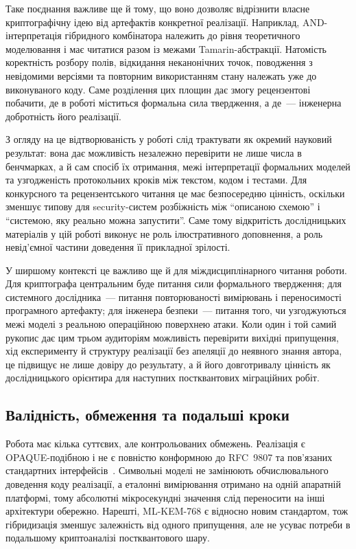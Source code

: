 \documentclass{llncs}
\begin{document}
Таке поєднання важливе ще й тому, що воно дозволяє відрізнити власне
криптографічну ідею від артефактів конкретної реалізації. Наприклад,
AND-інтерпретація гібридного комбінатора належить до рівня теоретичного
моделювання і має читатися разом із межами Tamarin-абстракції. Натомість
коректність розбору полів, відкидання неканонічних точок, поводження з
невідомими версіями та повторним використанням стану належать уже до
виконуваного коду. Саме розділення цих площин дає змогу рецензентові
побачити, де в роботі міститься формальна сила твердження, а де~---
інженерна добротність його реалізації.

З огляду на це відтворюваність у роботі слід трактувати як окремий
науковий результат: вона дає можливість незалежно перевірити не лише
числа в бенчмарках, а й сам спосіб їх отримання, межі інтерпретації
формальних моделей та узгодженість протокольних кроків між текстом,
кодом і тестами. Для конкурсного та рецензентського читання це має
безпосередню цінність, оскільки зменшує типову для security-систем
розбіжність між ``описаною схемою'' і ``системою, яку реально можна
запустити''. Саме тому відкритість дослідницьких матеріалів у цій роботі
виконує не роль ілюстративного доповнення, а роль невід'ємної частини
доведення її прикладної зрілості.

У ширшому контексті це важливо ще й для міждисциплінарного читання
роботи. Для криптографа центральним буде питання сили формального
твердження; для системного дослідника~--- питання повторюваності
вимірювань і переносимості програмного артефакту; для інженера
безпеки~--- питання того, чи узгоджуються межі моделі з реальною
операційною поверхнею атаки. Коли один і той самий рукопис дає цим
трьом аудиторіям можливість перевірити вихідні припущення, хід
експерименту й структуру реалізації без апеляції до неявного знання
автора, це підвищує не лише довіру до результату, а й його довготривалу
цінність як дослідницького орієнтира для наступних постквантових
міграційних робіт.

\subsection{Валідність, обмеження та подальші кроки}

Робота має кілька суттєвих, але контрольованих обмежень. Реалізація є
OPAQUE-подібною і не є повністю конформною до RFC~9807 та пов'язаних
стандартних інтерфейсів~\cite{ietf-opaque}. Символьні моделі не
замінюють обчислювального доведення коду реалізації, а еталонні
вимірювання отримано на одній апаратній платформі, тому абсолютні
мікросекундні значення слід переносити на інші архітектури обережно.
Нарешті, ML-KEM-768 є відносно новим стандартом, тож гібридизація
зменшує залежність від одного припущення, але не усуває потреби в
подальшому криптоаналізі постквантового шару.
\end{document}
